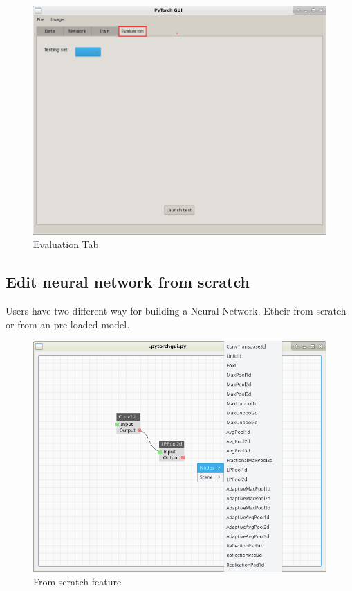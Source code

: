 \begin{figure}[ht!]
    \centering 
    \includegraphics[scale=0.4]{figures/app_screen_shoots/Evaluation_tab.png}
    \caption{Evaluation Tab}
\end{figure}

\newpage
\subsection{Edit neural network from scratch}
Users have two different way for building a Neural Network. Etheir from scratch or from an pre-loaded model.

\begin{figure}[h!]
    \centering 
    \includegraphics[scale=0.4]{figures/fromscratch.png}
    \caption{From scratch feature}
\end{figure}

